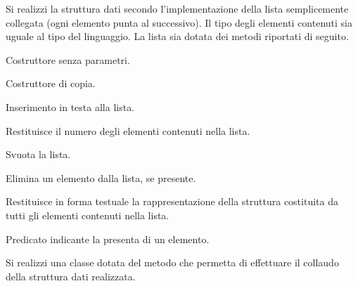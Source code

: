 Si realizzi la struttura dati  secondo l'implementazione della lista semplicemente collegata (ogni elemento punta al successivo). Il tipo degli elementi contenuti sia uguale al tipo  del linguaggio. La lista sia dotata dei metodi riportati di seguito.

\begin{methodslist}
 {
 Costruttore senza parametri.
}

 {
  Costruttore di copia.
}

 {
  Inserimento in testa alla lista.
}

 {
  Restituisce il numero degli elementi contenuti nella lista.
}

 {
  Svuota la lista.
}

 {
  Elimina un elemento dalla lista, se presente.
}

 {
  Restituisce in forma testuale la rappresentazione della struttura costituita da tutti gli elementi contenuti nella lista.
}

 {
  Predicato indicante la presenta di un elemento.
}

Si realizzi una classe  dotata del metodo  che permetta di effettuare il collaudo della struttura dati realizzata.

\end{methodslist}